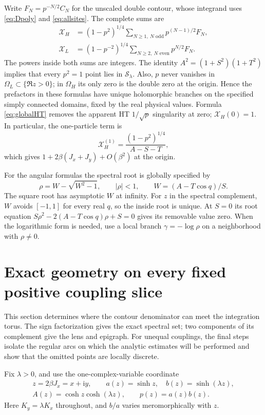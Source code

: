 \documentclass[11pt]{article}
\numberwithin{equation}{section}
\theoremstyle{definition}
\newcommand{\ii}{\mathrm i}
\newcommand{\cS}{\mathcal S}
\newcommand{\OH}{\Omega_H}
\newcommand{\OL}{\Omega_L}
\newcommand{\XH}{\mathcal X_H}
\newcommand{\XL}{\mathcal X_L}
\begin{document}
Write $F_N=p^{-N/2}C_N$ for the unscaled double contour, whose integrand
uses \eqref{eq:Dpoly} and \eqref{eq:allsites}. The complete sums are
\begin{align}
 \XH&=(1-p^2)^{1/4}\sum_{N\ge1,\ N\text{ odd}}p^{(N-1)/2}F_N,
                                                        \label{eq:globalHT}\\
 \XL&=(1-p^{-2})^{1/4}\sum_{N\ge2,\ N\text{ even}}p^{N/2}F_N.
                                                        \label{eq:globalLT}
\end{align}
The powers inside both sums are integers. The identity
$A^2=(1+S^2)(1+T^2)$ implies that every $p^2=1$ point lies in
$\cS_\lambda$. Also, $p$ never vanishes in $\OL\subset\{\Re z>0\}$;
in $\OH$ its only zero is the double zero at the origin. Hence the
prefactors in these formulas have unique holomorphic branches on the
specified simply connected domains, fixed by the real physical values.
Formula \eqref{eq:globalHT} removes the apparent HT $1/\sqrt p$
singularity at zero; $\XH(0)=1$. In particular, the one-particle term is
\[
 \XH^{(1)}=\frac{(1-p^2)^{1/4}}{A-S-T},
\]
which gives $1+2\beta(J_x+J_y)+O(\beta^2)$ at the origin.

For the angular formulas the spectral root is globally specified by
\[
 \rho=W-\sqrt{W^2-1},\qquad |\rho|<1,
 \qquad W=(A-T\cos q)/S.
\]
The square root has asymptotic $W$ at infinity. For $z$ in the spectral
complement, $W$ avoids $[-1,1]$ for every real $q$, so the inside root
is unique. At $S=0$ its root equation
$S\rho^2-2(A-T\cos q)\rho+S=0$ gives its removable value zero.
When the logarithmic form is needed, use a local branch
$\gamma=-\log\rho$ on a neighborhood with $\rho\ne0$.



\section{Exact geometry on every fixed positive coupling slice}\label{sec:geometry}

This section determines where the contour denominator can meet the
integration torus. The sign factorization gives the exact spectral set;
two components of its complement give the lens and epigraph. For unequal
couplings, the final steps isolate the regular arcs on which the analytic
estimates will be performed and show that the omitted points are locally
discrete.

Fix \(\lambda>0\), and use the one-complex-variable coordinate
\begin{gather*}
 z=2\beta J_x=x+\ii y,\qquad
 a(z)=\sinh z,\quad b(z)=\sinh(\lambda z),\\
 A(z)=\cosh z\cosh(\lambda z),\qquad p(z)=a(z)b(z).
\end{gather*}
Here \(K_y=\lambda K_x\) throughout, and \(b/a\) varies
meromorphically with \(z\).
\end{document}
